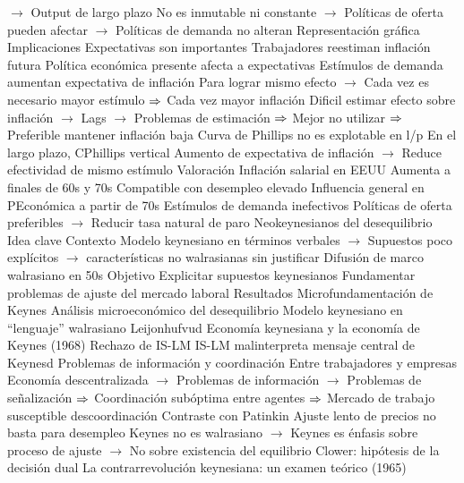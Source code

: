 \documentclass{nuevotema}
\begin{document}
\begin{esquemal}
				\4[] $\to$ Output de largo plazo
				\4[] No es inmutable ni constante
				\4[] $\to$ Políticas de oferta pueden afectar
				\4[] $\to$ Políticas de demanda no alteran
				\4 Representación gráfica
				\4[] 
			\3 Implicaciones
				\4 Expectativas son importantes
				\4[] Trabajadores reestiman inflación futura
				\4[] Política económica presente afecta a expectativas
				\4 Estímulos de demanda aumentan expectativa de inflación
				\4[] Para lograr mismo efecto
				\4[] $\to$ Cada vez es necesario mayor estímulo
				\4[] $\Rightarrow$ Cada vez mayor inflación
				\4[] Dificil estimar efecto sobre inflación
				\4[] $\to$ Lags
				\4[] $\to$ Problemas de estimación
				\4[] $\Rightarrow$ Mejor no utilizar
				\4[] $\Rightarrow$ Preferible mantener inflación baja
				\4 Curva de Phillips no es explotable en l/p
				\4[] En el largo plazo, CPhillips vertical
				\4[] Aumento de expectativa de inflación
				\4[] $\to$ Reduce efectividad de mismo estímulo
			\3 Valoración
				\4 Inflación salarial en EEUU
				\4[] Aumenta a finales de 60s y 70s
				\4[] Compatible con desempleo elevado
				\4 Influencia general en PEconómica a partir de 70s
				\4[] Estímulos de demanda inefectivos
				\4[] Políticas de oferta preferibles
				\4[] $\to$ Reducir tasa natural de paro
		\2 Neokeynesianos del desequilibrio
			\3 Idea clave
				\4 Contexto
				\4[] Modelo keynesiano en términos verbales
				\4[] $\to$ Supuestos poco explícitos
				\4[] $\to$ características no walrasianas sin justificar
				\4[] Difusión de marco walrasiano en 50s
				\4 Objetivo
				\4[] Explicitar supuestos keynesianos
				\4[] Fundamentar problemas de ajuste del mercado laboral
				\4 Resultados
				\4[] Microfundamentación de Keynes
				\4[] Análisis microeconómico del desequilibrio
				\4[] Modelo keynesiano en ``lenguaje'' walrasiano
			\3 Leijonhufvud
				\4 Economía keynesiana y la economía de Keynes (1968)
				\4 Rechazo de IS-LM
				\4[] IS-LM malinterpreta mensaje central de Keynesd
				\4 Problemas de información y coordinación
				\4[] Entre trabajadores y empresas
				\4 Economía descentralizada
				\4[] $\to$ Problemas de información
				\4[] $\to$ Problemas de señalización
				\4[] $\Rightarrow$ Coordinación subóptima entre agentes
				\4[] $\Rightarrow$ Mercado de trabajo susceptible descoordinación
				\4 Contraste con Patinkin
				\4[] Ajuste lento de precios no basta para desempleo
				\4[] Keynes no es walrasiano
				\4[] $\to$ Keynes es énfasis sobre proceso de ajuste
				\4[] $\to$ No sobre existencia del equilibrio
			\3 Clower: hipótesis de la decisión dual
				\4 La contrarrevolución keynesiana: un examen teórico (1965)

\end{esquemal}
\end{document}
